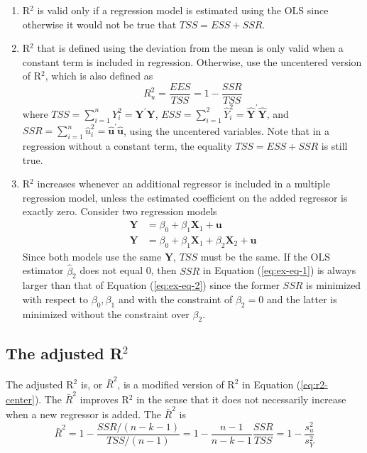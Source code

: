 \documentclass[a4paper,11pt]{article}
\begin{document}
\begin{enumerate}
\item R\(^{\text{2}}\) is valid only if a regression model is estimated using the OLS
since otherwise it would not be true that \(TSS = ESS + SSR\).
\item R\(^{\text{2}}\) that is defined using the deviation from the mean is only valid
when a constant term is included in regression. Otherwise, use the
uncentered version of R\(^{\text{2}}\), which is also defined as
\begin{equation}
\label{eq:r2-uncenter}
R^2_u = \frac{EES}{TSS} = 1 - \frac{SSR}{TSS}
\end{equation}
where \(TSS = \sum_{i=1}^n Y_i^2 = \mathbf{Y}^{\prime} \mathbf{Y}\),
\(ESS = \sum_{i=1}^2 \hat{Y}_i^2 = \hat{\mathbf{Y}}^{\prime}
   \hat{\mathbf{Y}}\), and \(SSR = \sum_{i=1}^n \hat{u}_i^2 =
   \hat{\mathbf{u}}^{\prime} \hat{\mathbf{u}}\), using the uncentered
variables.  Note that in a regression without a constant term, the
equality \(TSS = ESS + SSR\) is still true.
\item R\(^{\text{2}}\) increases whenever an additional regressor is included in a
multiple regression model, unless the estimated coefficient on the
added regressor is exactly zero. Consider two regression models
\begin{align}
\mathbf{Y} &= \beta_0 + \beta_1 \mathbf{X}_1 + \mathbf{u}
\label{eq:ex-eq-1} \\
\mathbf{Y} &= \beta_0 + \beta_1 \mathbf{X}_1 + \beta_2 \mathbf{X}_2 + \mathbf{u} \label{eq:ex-eq-2}
\end{align}
Since both models use the same \(\mathbf{Y}\), \(TSS\) must be the
same. If the OLS estimator \(\hat{\beta}_2\) does not equal 0, then
\(SSR\) in Equation (\ref{eq:ex-eq-1}) is always larger than that of
Equation (\ref{eq:ex-eq-2})  since the former \(SSR\) is minimized
with respect to \(\beta_0, \beta_1\) and with the constraint of
\(\beta_2 = 0\) and the latter is minimized without the constraint
over \(\beta_2\).
\end{enumerate}

\subsection{The adjusted R\(^{\text{2}}\)}
\label{sec:orgb8763cf}
The adjusted R\(^{\text{2}}\) is, or \(\bar{R}^2\), is a modified version of
R\(^{\text{2}}\) in Equation (\ref{eq:r2-center}). The \(\bar{R}^2\) improves R\(^{\text{2}}\) in the sense that it does not
necessarily increase when a new regressor is added. The \(\bar{R}^2\) is
\begin{equation}
\label{eq:adj-r2}
\bar{R}^2 = 1 - \frac{SSR / (n-k-1)}{TSS / (n-1)} = 1 - \frac{n-1}{n-k-1}\frac{SSR}{TSS} = 1 - \frac{s^2_u}{s^2_Y}
\end{equation}
\end{document}

